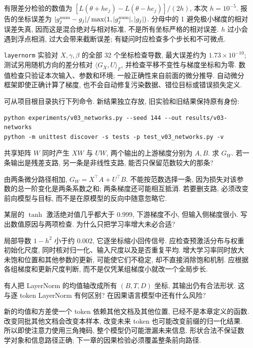 有限差分检验的数值为
$[L(\theta+h e_j)-L(\theta-h e_j)]/(2h)$, 本次 $h=10^{-5}$. 报告的坐标误差为 $|g_j^{\rm num}-g_j|/\max(1,|g_j^{\rm num}|,|g_j|)$. 分母中的 1 避免极小梯度的相对误差失真, 因而这是混合绝对与相对标准, 不是所有坐标严格的相对误差. $h$ 过小会遇到浮点相消, 过大会带来截断误差; 有疑问时应检查多个步长和不可微点.

\texttt{layernorm} 实验对 $X,\gamma,\beta$ 的全部 32 个坐标检查导数, 最大误差约为 $1.73\times10^{-10}$; 测试另用随机方向的差分核对 $\langle G_X,U\rangle_F$, 并检查平移不变性与梯度坐标和为零. 数值检查只验证本次输入、参数和环境; 一般正确性来自前面的微分推导. 自动微分框架即使正确计算了梯度, 也不会自动修复污染数据、错位目标或错误损失定义.

可从项目根目录执行下列命令. 新结果独立存放, 旧实验和旧结果保持原有身份:
\begin{verbatim}
python experiments/v03_networks.py --seed 144 --out results/v03-networks
python -m unittest discover -s tests -p test_v03_networks.py -v
\end{verbatim}

\begin{exercise}
共享矩阵 $W$ 同时产生 $XW$ 与 $UW$, 两个输出的上游梯度分别为 $A,B$. 求 $G_W$. 若一条输出是残差支路, 另一条是非线性支路, 能否只保留范数较大的那条?
\end{exercise}
\begin{solution}
由两条微分路径相加, $G_W=X^\top A+U^\top B$. 不能按范数选择一条, 因为损失对该参数的总一阶变化是两条系数之和; 两条梯度还可能相互抵消. 若要删支路, 必须改变前向模型与目标, 而不是在原模型的反向中随意忽略它.
\end{solution}
\begin{exercise}
某层的 $\tanh$ 激活绝对值几乎都大于 $0.999$, 下游梯度不小, 但输入侧梯度很小. 写出数值原因与两项检查. 为什么只把学习率增大未必合适?
\end{exercise}
\begin{solution}
局部导数 $1-h^2$ 小于约 $0.002$, 它逐坐标缩小回传信号. 应检查预激活分布与权重初始化尺度, 同时核对归一化、输入尺度以及是否重复平均. 增大学习率同时放大未饱和位置和其他参数的更新, 可能使它们不稳定, 却不直接消除饱和机制. 应根据各组梯度和更新尺度判断, 而不是仅凭某组梯度小就改一个全局步长.
\end{solution}
\begin{exercise}
有人把 LayerNorm 的均值轴改成所有 $(B,T,D)$ 坐标, 其输出仍有合法形状. 这与逐 token LayerNorm 有何区别? 在因果语言模型中还有什么风险?
\end{exercise}
\begin{solution}
新的均值和方差使一个 token 依赖其他文档及其他位置, 已经不是本章定义的函数. 改变同批其他文档会改变本样本, 改变未来 token 也可能改变前缀的归一化结果. 所以即使注意力使用三角掩码, 整个模型仍可能泄漏未来信息. 形状合法不保证数学对象和信息路径正确; 下一章的因果检验必须覆盖整条前向路径.
\end{solution}
\label{ch:end:06}
